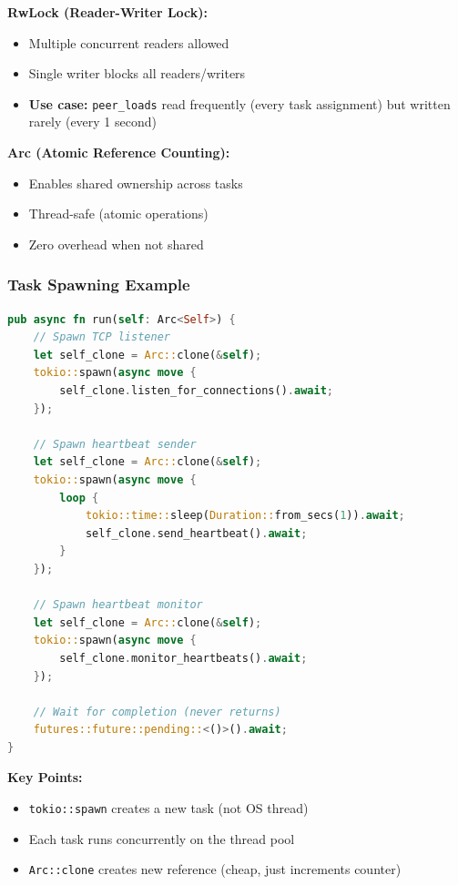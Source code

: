 \documentclass[12pt,a4paper]{article}
\begin{document}
\textbf{RwLock (Reader-Writer Lock):}
\begin{itemize}
    \item Multiple concurrent readers allowed
    \item Single writer blocks all readers/writers
    \item \textbf{Use case:} \texttt{peer\_loads} read frequently (every task assignment) but written rarely (every 1 second)
\end{itemize}

\textbf{Arc (Atomic Reference Counting):}
\begin{itemize}
    \item Enables shared ownership across tasks
    \item Thread-safe (atomic operations)
    \item Zero overhead when not shared
\end{itemize}

\subsubsection{Task Spawning Example}

\begin{lstlisting}[language=Rust,caption={Spawning Concurrent Tasks},label=lst:spawn]
pub async fn run(self: Arc<Self>) {
    // Spawn TCP listener
    let self_clone = Arc::clone(&self);
    tokio::spawn(async move {
        self_clone.listen_for_connections().await;
    });

    // Spawn heartbeat sender
    let self_clone = Arc::clone(&self);
    tokio::spawn(async move {
        loop {
            tokio::time::sleep(Duration::from_secs(1)).await;
            self_clone.send_heartbeat().await;
        }
    });

    // Spawn heartbeat monitor
    let self_clone = Arc::clone(&self);
    tokio::spawn(async move {
        self_clone.monitor_heartbeats().await;
    });

    // Wait for completion (never returns)
    futures::future::pending::<()>().await;
}
\end{lstlisting}

\textbf{Key Points:}
\begin{itemize}
    \item \texttt{tokio::spawn} creates a new task (not OS thread)
    \item Each task runs concurrently on the thread pool
    \item \texttt{Arc::clone} creates new reference (cheap, just increments counter)
\end{itemize}
\end{document}
